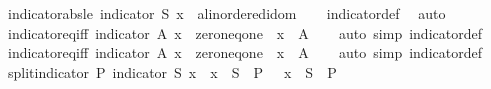 \begin{isabellebody}
\isanewline
{}\isamarkupfalse%
\ indicator{\isacharunderscore}abs{\isacharunderscore}le{\isacharunderscore}{}{\isacharcolon}\ {\isachardoublequoteopen}{\isasymbar}indicator\ S\ x{\isasymbar}\ {\isasymle}\ {\isacharparenleft}{}{\isacharcolon}{\isacharcolon}{\isacharprime}a{\isacharcolon}{\isacharcolon}linordered{\isacharunderscore}idom{\isacharparenright}{\isachardoublequoteclose}\isanewline
%
\isadelimproof
\ \ %
\endisadelimproof
%
\isatagproof
{}\isamarkupfalse%
\ indicator{\isacharunderscore}def\ \isamarkupfalse%
\ auto%
\endisatagproof
{\isafoldproof}%
%
\isadelimproof
\isanewline
%
\endisadelimproof
\isanewline
{}\isamarkupfalse%
\ indicator{\isacharunderscore}eq{\isacharunderscore}{}{\isacharunderscore}iff{\isacharcolon}\ {\isachardoublequoteopen}indicator\ A\ x\ {\isacharequal}\ {\isacharparenleft}{}{\isacharcolon}{\isacharcolon}{\isacharunderscore}{\isacharcolon}{\isacharcolon}zero{\isacharunderscore}neq{\isacharunderscore}one{\isacharparenright}\ {\isasymlongleftrightarrow}\ x\ {\isasymnotin}\ A{\isachardoublequoteclose}\isanewline
%
\isadelimproof
\ \ %
\endisadelimproof
%
\isatagproof
{}\isamarkupfalse%
\ {\isacharparenleft}auto\ simp{\isacharcolon}\ indicator{\isacharunderscore}def{\isacharparenright}%
\endisatagproof
{\isafoldproof}%
%
\isadelimproof
\isanewline
%
\endisadelimproof
\isanewline
{}\isamarkupfalse%
\ indicator{\isacharunderscore}eq{\isacharunderscore}{}{\isacharunderscore}iff{\isacharcolon}\ {\isachardoublequoteopen}indicator\ A\ x\ {\isacharequal}\ {\isacharparenleft}{}{\isacharcolon}{\isacharcolon}{\isacharunderscore}{\isacharcolon}{\isacharcolon}zero{\isacharunderscore}neq{\isacharunderscore}one{\isacharparenright}\ {\isasymlongleftrightarrow}\ x\ {\isasymin}\ A{\isachardoublequoteclose}\isanewline
%
\isadelimproof
\ \ %
\endisadelimproof
%
\isatagproof
{}\isamarkupfalse%
\ {\isacharparenleft}auto\ simp{\isacharcolon}\ indicator{\isacharunderscore}def{\isacharparenright}%
\endisatagproof
{\isafoldproof}%
%
\isadelimproof
\isanewline
%
\endisadelimproof
\isanewline
{}\isamarkupfalse%
\ split{\isacharunderscore}indicator{\isacharcolon}\ {\isachardoublequoteopen}P\ {\isacharparenleft}indicator\ S\ x{\isacharparenright}\ {\isasymlongleftrightarrow}\ {\isacharparenleft}{\isacharparenleft}x\ {\isasymin}\ S\ {\isasymlongrightarrow}\ P\ {}{\isacharparenright}\ {\isasymand}\ {\isacharparenleft}x\ {\isasymnotin}\ S\ {\isasymlongrightarrow}\ P\ {}{\isacharparenright}{\isacharparenright}{\isachardoublequoteclose}\isanewline

\end{isabellebody}
